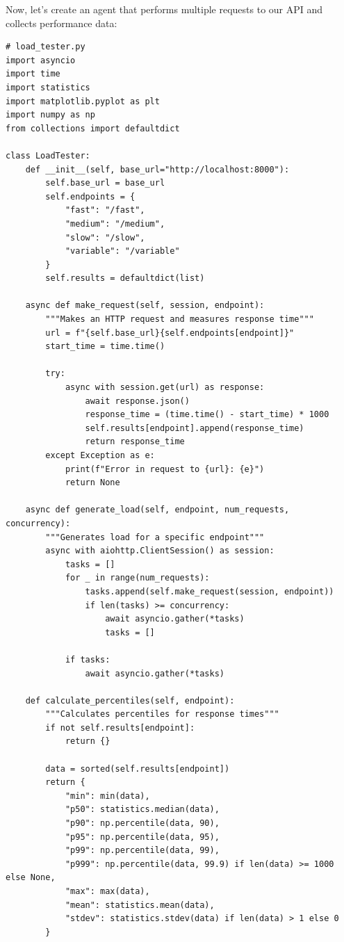 \documentclass[12pt,letterpaper]{article}
\newenvironment{macterminal}{%
    \begin{mdframed}[
        linecolor=terminalFrame,
        backgroundcolor=terminalBg,
        roundcorner=5pt,
        skipabove=10pt,
        skipbelow=10pt,
        linewidth=1pt,
        innertopmargin=10pt, %
        frametitle={%
            \tikz[baseline=(current bounding box.east), outer sep=0pt]{
                \fill[red!80!black] (0,0) circle (5pt);
                \fill[yellow!80!black] (0.7,0) circle (5pt);
                \fill[green!70!black] (1.4,0) circle (5pt);
            }
        },
        frametitlealignment=\raggedright, %
        frametitleaboveskip=8pt, %
        frametitlebelowskip=0pt, %
    ]
}{%
    \end{mdframed}%
}
\begin{document}
Now, let's create an agent that performs multiple requests to our API and collects performance data:

\begin{macterminal}
\begin{lstlisting}
# load_tester.py
import asyncio
import time
import statistics
import matplotlib.pyplot as plt
import numpy as np
from collections import defaultdict

class LoadTester:
    def __init__(self, base_url="http://localhost:8000"):
        self.base_url = base_url
        self.endpoints = {
            "fast": "/fast",
            "medium": "/medium",
            "slow": "/slow",
            "variable": "/variable"
        }
        self.results = defaultdict(list)
    
    async def make_request(self, session, endpoint):
        """Makes an HTTP request and measures response time"""
        url = f"{self.base_url}{self.endpoints[endpoint]}"
        start_time = time.time()
        
        try:
            async with session.get(url) as response:
                await response.json()
                response_time = (time.time() - start_time) * 1000
                self.results[endpoint].append(response_time)
                return response_time
        except Exception as e:
            print(f"Error in request to {url}: {e}")
            return None
    
    async def generate_load(self, endpoint, num_requests, concurrency):
        """Generates load for a specific endpoint"""
        async with aiohttp.ClientSession() as session:
            tasks = []
            for _ in range(num_requests):
                tasks.append(self.make_request(session, endpoint))
                if len(tasks) >= concurrency:
                    await asyncio.gather(*tasks)
                    tasks = []
            
            if tasks:
                await asyncio.gather(*tasks)
    
    def calculate_percentiles(self, endpoint):
        """Calculates percentiles for response times"""
        if not self.results[endpoint]:
            return {}
        
        data = sorted(self.results[endpoint])
        return {
            "min": min(data),
            "p50": statistics.median(data),
            "p90": np.percentile(data, 90),
            "p95": np.percentile(data, 95),
            "p99": np.percentile(data, 99),
            "p999": np.percentile(data, 99.9) if len(data) >= 1000 else None,
            "max": max(data),
            "mean": statistics.mean(data),
            "stdev": statistics.stdev(data) if len(data) > 1 else 0
        }
    

\end{lstlisting}
\end{macterminal}
\end{document}
